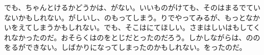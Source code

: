 でも、ちゃんとけるかどうかは、がない。いいものがけても、そのはまるでていないかもしれない。がしいし、のもってしまう。りでやってみるが、もっとなかいをえてしまうかもしれない。でも、そこはにてほしい。さまはしいはもしてくれなかったのだ。おそらくはのをとじだとったのだろう。しかしながらは、ののをるができない。しばかりになってしまったのかもしれない。をったのだ。


